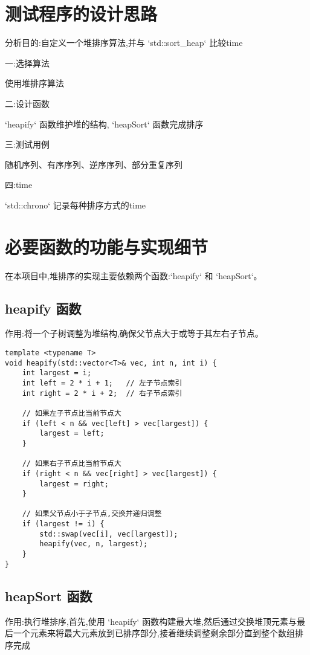 \documentclass[UTF8]{ctexart}
\begin{document}
\pagestyle{fancy}
\fancyhead{}

\section{测试程序的设计思路}
分析目的:自定义一个堆排序算法,并与  `std::sort\_heap` 比较time

一:选择算法

使用堆排序算法

二:设计函数

 `heapify` 函数维护堆的结构, `heapSort` 函数完成排序

三:测试用例

随机序列、有序序列、逆序序列、部分重复序列

四:time

`std::chrono` 记录每种排序方式的time 

\section{必要函数的功能与实现细节}
在本项目中,堆排序的实现主要依赖两个函数:`heapify` 和 `heapSort`。

\subsection{heapify 函数}
作用:将一个子树调整为堆结构,确保父节点大于或等于其左右子节点。

\begin{verbatim}
template <typename T>
void heapify(std::vector<T>& vec, int n, int i) {
    int largest = i;
    int left = 2 * i + 1;   // 左子节点索引
    int right = 2 * i + 2;  // 右子节点索引

    // 如果左子节点比当前节点大
    if (left < n && vec[left] > vec[largest]) {
        largest = left;
    }

    // 如果右子节点比当前节点大
    if (right < n && vec[right] > vec[largest]) {
        largest = right;
    }

    // 如果父节点小于子节点,交换并递归调整
    if (largest != i) {
        std::swap(vec[i], vec[largest]);
        heapify(vec, n, largest);
    }
}
\end{verbatim}

\subsection{heapSort 函数}
作用:执行堆排序,首先,使用 `heapify` 函数构建最大堆,然后通过交换堆顶元素与最后一个元素来将最大元素放到已排序部分,接着继续调整剩余部分直到整个数组排序完成
\end{document}
